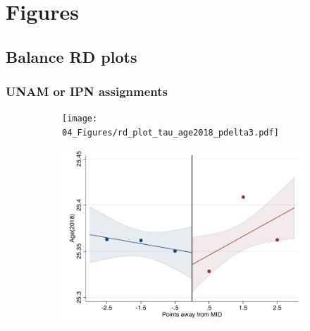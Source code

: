 \documentclass[oneside,11pt]{article}
\begin{document}
\clearpage

\section{Figures}

\subsection{Balance RD plots}

\subsubsection{UNAM or IPN assignments}

\begin{figure}[H]

    \caption{RD plots for balance variables across those assigned to either UNAM or IPN high-school, and those who are not\label{fig:Balance_rd_plot_elite_1}}
    \begin{center}
    
    \begin{subfigure}{0.475\textwidth}
        \centering
        \texttt{[image: 04\_Figures/rd\_plot\_tau\_age2018\_pdelta3.pdf]}
    \end{subfigure}
    \begin{subfigure}{0.475\textwidth}
        \centering
        \includegraphics[width=\textwidth]{04_Figures/rd_plot_mid_age2018_pdelta3.pdf}
    \end{subfigure}


\end{center}
\end{figure}
\end{document}
